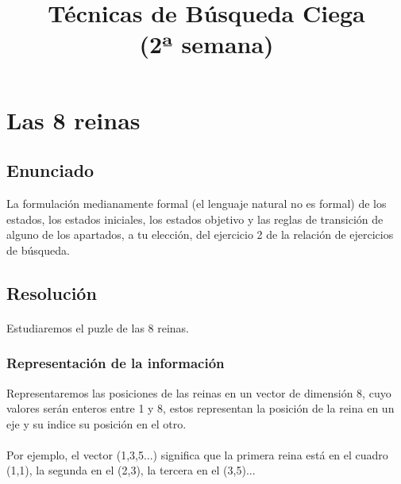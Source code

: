 \documentclass[a4paper,10pt]{article}
\title{Técnicas de Búsqueda Ciega\\(2ª semana)}
\author{}
\begin{document}
\maketitle
\pagebreak
\tableofcontents
\pagebreak

\section{Las 8 reinas}
\subsection{Enunciado}
La formulación medianamente formal (el lenguaje natural no es formal) de los estados, los estados iniciales, los estados objetivo y las reglas de transición de alguno de los apartados, a tu elección, del ejercicio 2 de la relación de ejercicios de búsqueda.
\subsection{Resolución}
\paragraph{}
Estudiaremos el puzle de las 8 reinas.
\subsubsection{Representación de la información}
Representaremos las posiciones de las reinas en un vector de dimensión 8, cuyo valores serán enteros entre 1 y 8, estos representan la posición de la reina en un eje y su indice su posición en el otro.
\paragraph{}
Por ejemplo, el vector (1,3,5...) significa que la primera reina está en el cuadro (1,1), la segunda en el (2,3), la tercera en el (3,5)...
\end{document}
